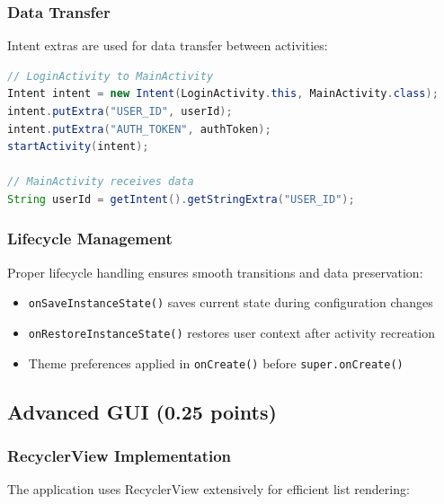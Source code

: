 \documentclass[12pt,a4paper]{article}
\begin{document}
\subsubsection{Data Transfer}
Intent extras are used for data transfer between activities:

\begin{lstlisting}[language=Java, caption=Activity Data Transfer]
// LoginActivity to MainActivity
Intent intent = new Intent(LoginActivity.this, MainActivity.class);
intent.putExtra("USER_ID", userId);
intent.putExtra("AUTH_TOKEN", authToken);
startActivity(intent);

// MainActivity receives data
String userId = getIntent().getStringExtra("USER_ID");
\end{lstlisting}

\subsubsection{Lifecycle Management}
Proper lifecycle handling ensures smooth transitions and data preservation:
\begin{itemize}
    \item \texttt{onSaveInstanceState()} saves current state during configuration changes
    \item \texttt{onRestoreInstanceState()} restores user context after activity recreation
    \item Theme preferences applied in \texttt{onCreate()} before \texttt{super.onCreate()}
\end{itemize}

\subsection{Advanced GUI (0.25 points)}

\subsubsection{RecyclerView Implementation}
The application uses RecyclerView extensively for efficient list rendering:
\end{document}
